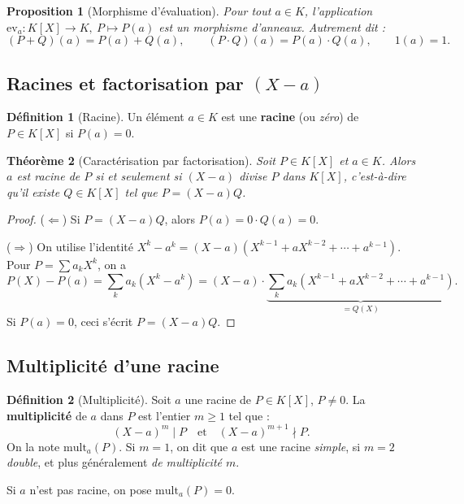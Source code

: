 \documentclass[12pt,a4paper]{report}
\newtheorem{theoreme}{Théorème}[section]
\newtheorem{proposition}[theoreme]{Proposition}
\theoremstyle{definition}
\newtheorem{definition}{Définition}[section]
\theoremstyle{remark}
\begin{document}
\begin{proposition}[Morphisme d'évaluation]
Pour tout $a \in K$, l'application $\mathrm{ev}_a : K[X] \to K,\ P \mapsto P(a)$ est un morphisme d'anneaux. Autrement dit :
\[ (P + Q)(a) = P(a) + Q(a), \qquad (P \cdot Q)(a) = P(a) \cdot Q(a), \qquad 1(a) = 1. \]
\end{proposition}

\subsection{Racines et factorisation par $(X - a)$}

\begin{definition}[Racine]
Un élément $a \in K$ est une \textbf{racine} (ou \emph{zéro}) de $P \in K[X]$ si $P(a) = 0$.
\end{definition}

\begin{theoreme}[Caractérisation par factorisation]
Soit $P \in K[X]$ et $a \in K$. Alors $a$ est racine de $P$ si et seulement si $(X - a)$ divise $P$ dans $K[X]$, c'est-à-dire qu'il existe $Q \in K[X]$ tel que $P = (X - a) Q$.
\end{theoreme}

\begin{proof}
($\Leftarrow$) Si $P = (X - a) Q$, alors $P(a) = 0 \cdot Q(a) = 0$.

($\Rightarrow$) On utilise l'identité $X^k - a^k = (X - a)(X^{k-1} + a X^{k-2} + \cdots + a^{k-1})$. Pour $P = \sum a_k X^k$, on a
\[ P(X) - P(a) = \sum_{k} a_k (X^k - a^k) = (X - a) \cdot \underbrace{\sum_{k} a_k (X^{k-1} + a X^{k-2} + \cdots + a^{k-1})}_{= Q(X)}. \]
Si $P(a) = 0$, ceci s'écrit $P = (X - a) Q$.
\end{proof}

\subsection{Multiplicité d'une racine}

\begin{definition}[Multiplicité]
Soit $a$ une racine de $P \in K[X]$, $P \neq 0$. La \textbf{multiplicité} de $a$ dans $P$ est l'entier $m \ge 1$ tel que :
\[ (X - a)^m \mid P \quad \text{et} \quad (X - a)^{m+1} \nmid P. \]
On la note $\mathrm{mult}_a(P)$. Si $m = 1$, on dit que $a$ est une racine \emph{simple}, si $m = 2$ \emph{double}, et plus généralement \emph{de multiplicité $m$}.

Si $a$ n'est pas racine, on pose $\mathrm{mult}_a(P) = 0$.
\end{definition}
\end{document}

